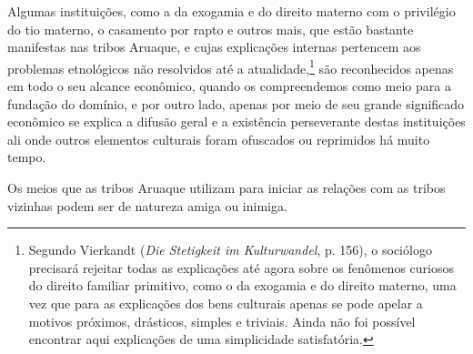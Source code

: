 Algumas instituições, como a da exogamia e do direito materno com o
privilégio do tio materno, o casamento por rapto e outros mais, que
estão bastante manifestas nas tribos Aruaque, e cujas explicações
internas pertencem aos problemas etnológicos não resolvidos até a
atualidade,\footnote{Segundo Vierkandt (\emph{Die Stetigkeit im
  Kulturwandel}, p. 156), o sociólogo precisará rejeitar todas as
  explicações até agora sobre os fenômenos curiosos do direito familiar
  primitivo, como o da exogamia e do direito materno, uma vez que para
  as explicações dos bens culturais apenas se pode apelar a motivos
  próximos, drásticos, simples e triviais. Ainda não foi possível
  encontrar aqui explicações de uma simplicidade satisfatória.} são
reconhecidos apenas em todo o seu alcance econômico, quando os
compreendemos como meio para a fundação do domínio, e por outro lado,
apenas por meio de seu grande significado econômico se explica a difusão
geral e a existência perseverante destas instituições ali onde outros
elementos culturais foram ofuscados ou reprimidos há muito tempo.

Os meios que as tribos Aruaque utilizam para iniciar as relações com as
tribos vizinhas podem ser de natureza amiga ou inimiga.

